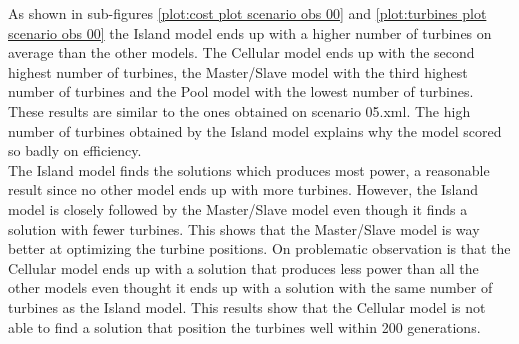 \noindent As shown in sub-figures \ref{plot:cost plot scenario obs 00} and \ref{plot:turbines plot scenario obs 00} the Island model ends up with a higher number of turbines on average than the other models. The Cellular model ends up with the second highest number of turbines, the Master/Slave model with the third highest number of turbines and the Pool model with the lowest number of turbines. These results are similar to the ones obtained on scenario 05.xml. The high number of turbines obtained by the Island model explains why the model scored so badly on efficiency.\\

\noindent The Island model finds the solutions which produces most power, a reasonable result since no other model ends up with more turbines. However, the Island model is closely followed by the Master/Slave model even though it finds a solution with fewer turbines. This shows that the Master/Slave model is way better at optimizing the turbine positions. On problematic observation is that the Cellular model ends up with a solution that produces less power than all the other models even thought it ends up with a solution with the same number of turbines as the Island model. This results show that the Cellular model is not able to find a solution that position the turbines well within 200 generations. \\


